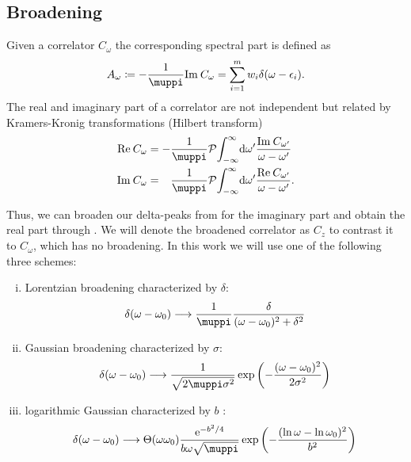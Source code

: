 \subsection{Broadening}

Given a correlator $C_\omega$ the corresponding spectral part is defined as
\begin{equation}
    A_\omega \coloneq -\frac{1}{\muppi}\Im C_\omega = \sum_{i=1}^m w_i \delta(\omega - \epsilon_i).
    \label{eq:spectral-part}
\end{equation}
The real and imaginary part of a correlator are not independent
but related by Kramers-Kronig transformations (Hilbert transform)
\begin{subequations}
    \begin{align}
        \Re C_\omega
         & =
        - \frac{1}{\muppi} \mathcal{P}\! \int_{-\infty}^\infty\! \md\omega'
        \frac{\Im C_{\omega'}}{\omega - \omega'}
        \label{eq:kramers-kroneg-real} \\
        \Im C_\omega
         & =
        \phantom{-} \frac{1}{\muppi} \mathcal{P}\! \int_{-\infty}^\infty\! \md\omega'
        \frac{\Re C_{\omega'}}{\omega - \omega'}.
        \label{eq:kramers-kronig-imag}
    \end{align}
\end{subequations}

Thus, we can broaden our delta-peaks from 
for the imaginary part and obtain the real part through .
We will denote the broadened correlator as $C_z$
to contrast it to $C_\omega$, which has no broadening.
In this work we will use one of the following three schemes:
\begin{enumerate}[(i)]
    \item Lorentzian broadening characterized by $\delta$:
          \label{item:lorentzian}
          \begin{equation}
              \delta(\omega - \omega_0)
              \longrightarrow
              \frac{1}{\muppi}\frac{\delta}{(\omega - \omega_0)^2 + \delta^2}
          \end{equation}
    \item Gaussian broadening characterized by $\sigma$:
          \label{item:gaussian}
          \begin{equation}
              \delta(\omega - \omega_0)
              \longrightarrow
              \frac{1}{\sqrt{2\muppi \sigma^2}}\exp\left(-\frac{(\omega - \omega_0)^2}{2\sigma^2}\right)
          \end{equation}
    \item logarithmic Gaussian characterized by $b$ \cite{Bulla2008}:
          \label{item:logarithmic-gaussian}
          \begin{equation}
              \delta(\omega - \omega_0)
              \longrightarrow
              \Theta(\omega\omega_0)\frac{\me^{-b^2/4}}{b\omega\sqrt{\muppi}}\exp\left(-\frac{(\ln\omega-\ln\omega_0)^2}{b^2}\right)
          \end{equation}
\end{enumerate}

